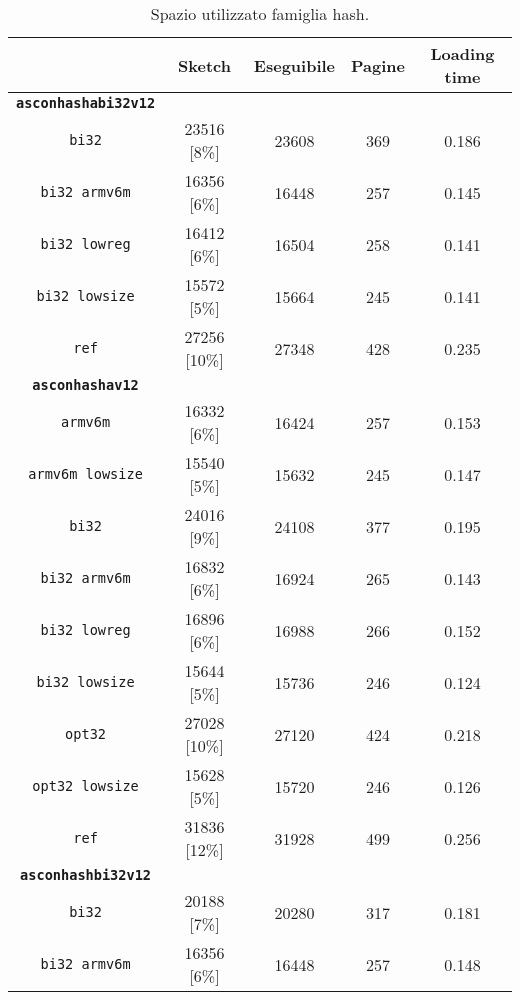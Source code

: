 \begin{table}[h]
    \caption{Spazio utilizzato famiglia hash.}
    \centering
    \begin{adjustbox}{width=207pt}
	\begin{tabular}{|c|c|c|c|c|}
		\hline
         & \textbf{Sketch} & \textbf{Eseguibile} & \textbf{Pagine} & \textbf{Loading time} \\
        \hline
        \texttt{\textbf{asconhashabi32v12}} & & & & \\
        \hline
        \texttt{bi32} & 23516 [8\%] & 23608 & 369 & 0.186 \\
        \hline
        \texttt{bi32 armv6m} & 16356 [6\%] & 16448 & 257 & 0.145 \\
        \hline
        \texttt{bi32 lowreg} & 16412 [6\%] & 16504 & 258 & 0.141 \\
        \hline
        \texttt{bi32 lowsize} & 15572 [5\%] & 15664 & 245 & 0.141 \\
        \hline
        \texttt{ref} & 27256 [10\%] & 27348 & 428 & 0.235 \\
        \hline
        \texttt{\textbf{asconhashav12}} & & & & \\
        \hline
        \texttt{armv6m} & 16332 [6\%] & 16424 & 257 & 0.153 \\
        \hline
        \texttt{armv6m lowsize} & 15540 [5\%] & 15632 & 245 & 0.147 \\
        \hline
        \texttt{bi32} & 24016 [9\%] & 24108 & 377 & 0.195 \\
        \hline
        \texttt{bi32 armv6m} & 16832 [6\%] & 16924 & 265 & 0.143 \\
        \hline
        \texttt{bi32 lowreg} & 16896 [6\%] & 16988 & 266 & 0.152 \\
        \hline
        \texttt{bi32 lowsize} & 15644 [5\%] & 15736 & 246 & 0.124 \\
        \hline
        \texttt{opt32} & 27028 [10\%] & 27120 & 424 & 0.218 \\
        \hline
        \texttt{opt32 lowsize} & 15628 [5\%] & 15720 & 246 & 0.126 \\
        \hline
        \texttt{ref} & 31836 [12\%] & 31928 & 499 & 0.256 \\
        \hline
        \texttt{\textbf{asconhashbi32v12}} & & & & \\
        \hline
        \texttt{bi32} & 20188 [7\%] & 20280 & 317 & 0.181 \\
        \hline
        \texttt{bi32 armv6m} & 16356 [6\%] & 16448 & 257 & 0.148 \\

\end{tabular}
\end{adjustbox}
\end{table}
